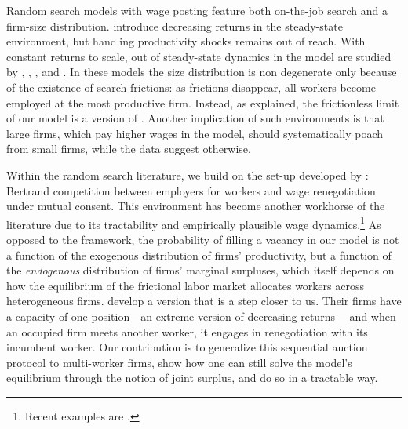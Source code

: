Random search models with wage posting feature both on-the-job search and a firm-size distribution.
\citet{BilalOutsource} introduce decreasing returns in the steady-state \citet{burdettmortensen1998} environment, but handling productivity shocks remains out of reach.
With constant returns to scale, out of steady-state dynamics in the \citet{burdettmortensen1998} model are studied by \citet{moscarini2013stochastic,moscapv}, \citet{colemortensen2016}, \citet{engbom2017firm}, \citet{gouin2018productivity} and \citet{audoly2019firmdynamics}.
In these models the size distribution is non degenerate only because of the existence of search frictions: as frictions disappear, all workers become employed at the most productive firm.
Instead, as explained, the frictionless limit of our model is a version of \citet{HopenhaynEMET}.
Another implication of such environments is that large firms, which pay higher wages in the model, should systematically poach from small firms, while the data suggest otherwise.

Within the random search literature, we build on the set-up developed by \citet{postelvinayrobin2002}: Bertrand competition between employers for workers and wage renegotiation under mutual consent.
This environment has become another workhorse of the literature due to its tractability and empirically plausible wage dynamics.\footnote{
    Recent examples are \citet{pvtearnings2010,Jaroschnber,lindenlaub2016multidimensional,borovickova2016job,LiseRobinAER}.}
As opposed to the \citet{postelvinayrobin2002} framework, the probability of filling a vacancy in our model is not a function of the exogenous distribution of firms' productivity, but a function of the \emph{endogenous} distribution of firms' marginal surpluses, which itself depends on how the equilibrium of the frictional labor market allocates workers across heterogeneous firms.
\citet{kiyotaki2007model} develop a version that is a step closer to us.
Their firms have a capacity of one position---an extreme version of decreasing returns--- and when an occupied firm meets another worker, it engages in renegotiation with its incumbent worker.
Our contribution is to generalize this sequential auction protocol to multi-worker firms, show how one can still solve the model's equilibrium through the notion of joint surplus, and do so in a tractable way.

